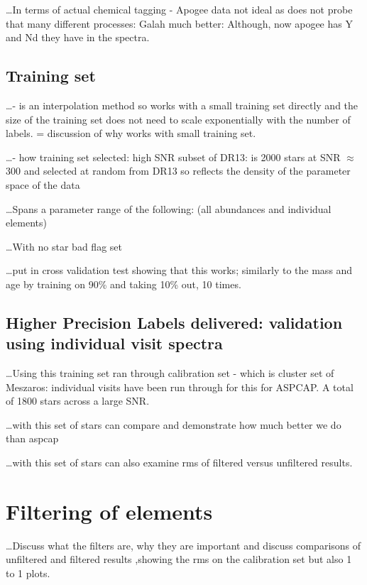 \documentclass[12pt, preprint]{aastex}
\begin{document}
\ldots In terms of actual chemical tagging - Apogee data not ideal as does not probe that many different processes: Galah much better: Although, now apogee has Y and Nd they have in the spectra.  

\subsection{Training set} 

\ldots - is an interpolation method so works with a small training set directly and the size of the training set does not need to scale exponentially with the number of labels. = discussion of why works with small training set. 

\ldots - how training set selected: high SNR subset of DR13: is 2000 stars at SNR $\approx$ 300 and selected at random from DR13 so reflects the density of the parameter space of the data

\ldots Spans a parameter range of the following: (all abundances and individual elements) 

\ldots With no star bad flag set 



\ldots put in cross validation test showing that this works; similarly to the mass and age by training on 90\% and taking 10\% out, 10 times.

\subsection{Higher Precision Labels delivered: validation using individual visit spectra} 

\ldots Using this training set ran through calibration set - which is cluster set of Meszaros: individual visits have been run through for this for ASPCAP. A total of 1800 stars across a large SNR. 

\ldots with this set of stars can compare and demonstrate how much better we do than aspcap

\ldots with this set of stars can also examine rms of filtered versus unfiltered results. 


\section{Filtering of elements} 

\ldots Discuss what the filters are, why they are important and discuss comparisons of unfiltered and filtered results ,showing the rms on the calibration set but also 1 to 1 plots. 
\end{document}
